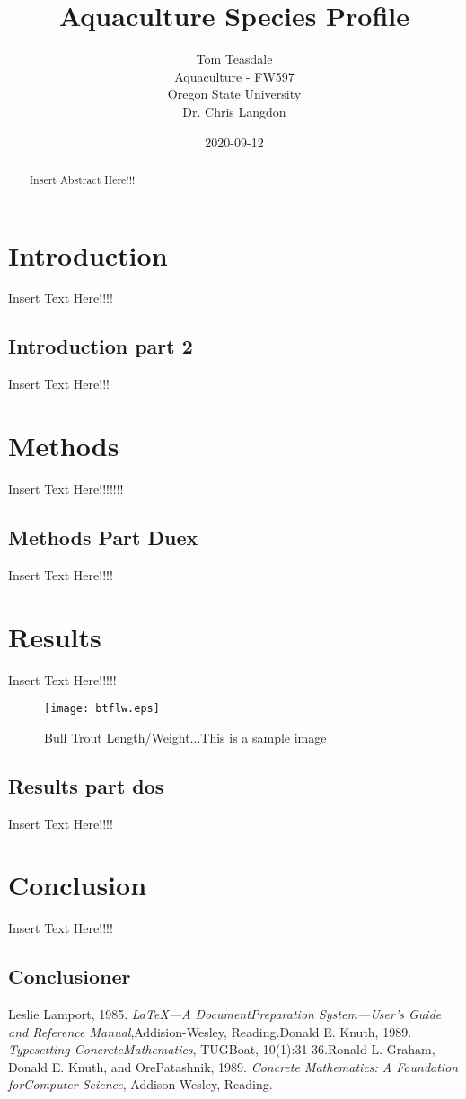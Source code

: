 \documentclass[12pt]{article}
\title{Aquaculture Species Profile}
\date{2020-09-12}
\author{Tom Teasdale\\
	Aquaculture -  FW597\\
	Oregon State University\\
	Dr. Chris Langdon}
\begin{document}
	\maketitle
\newpage
\tableofcontents
\newpage
\begin{abstract}
Insert Abstract Here!!!
\end{abstract}
\newpage
{}
\section{Introduction}
Insert Text Here!!!!
\subsection{Introduction part 2}
Insert Text Here!!!
\section{Methods}
Insert Text Here!!!!!!!
\subsection{Methods Part Duex}
Insert Text Here!!!!
\section{Results}
Insert Text Here!!!!!
\begin{figure}
\begin{center}
\texttt{[image: btflw.eps]}
\caption{Bull Trout Length/Weight...This is a sample image}
\end{center}
\end{figure}
\subsection{Results part dos}
Insert Text Here!!!!
\section{Conclusion}
Insert Text Here!!!!
\subsection{Conclusioner}
\newpage
\begin{thebibliography}{9}Leslie Lamport, 1985. \emph{\LaTeX---A DocumentPreparation System---User’s Guide and Reference Manual},Addision-Wesley, Reading.Donald E. Knuth, 1989. \emph{Typesetting ConcreteMathematics}, TUGBoat, 10(1):31-36.Ronald L. Graham, Donald E. Knuth, and OrePatashnik, 1989. \emph{Concrete Mathematics: A Foundation forComputer Science}, Addison-Wesley, Reading.\end{thebibliography}
\end{document}
